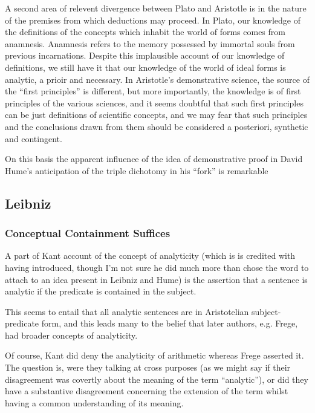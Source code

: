 \documentclass[10pt,titlepage]{article}
\begin{document}
A second area of relevent divergence between Plato and Aristotle is in the nature of the premises from which deductions may proceed.
In Plato, our knowledge of the definitions of the concepts which inhabit the world of forms comes from anamnesis.
Anamnesis refers to the memory possessed by immortal souls from previous incarnations.
Despite this implausible account of our knowledge of definitions, we still have it that our knowledge of the world of ideal forms is analytic, a prioir and necessary.
In Aristotle's demonstrative science, the source of the ``first principles'' is different, but more importantly, the knowledge is of first principles of the various sciences, and it seems doubtful that such first principles can be just definitions of scientific concepts, and we may fear that such principles and the conclusions drawn from them should be considered a posteriori, synthetic and contingent.

On this basis the apparent influence of the idea of demonstrative proof in David Hume's anticipation of the triple dichotomy in his ``fork'' is remarkable


\subsection{Leibniz}



\subsubsection{Conceptual Containment Suffices}

A part of Kant account of the concept of analyticity (which is is credited with having introduced, though I'm not sure he did much more than chose the word to attach to an idea present in Leibniz and Hume) is the assertion that a sentence is analytic if the predicate is contained in the subject.

This seems to entail that all analytic sentences are in Aristotelian subject-predicate form, and this leads many to the belief that later authors, e.g. Frege, had broader concepts of analyticity.

Of course, Kant did deny the analyticity of arithmetic whereas Frege asserted it.
The question is, were they talking at cross purposes (as we might say if their
disagreement was covertly about the meaning of the term ``analytic''), or did they
have a substantive disagreement concerning the extension of the term whilst having
a common understanding of its meaning.
\end{document}
